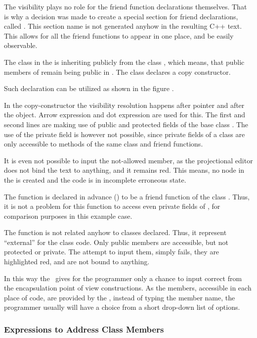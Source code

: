 The visibility plays no role for the friend function 
declarations themselves. That is why a decision was made to create a special 
section for friend declarations, called . This section name is not generated anyhow in the 
resulting C++ text. This allows for all the friend functions to appear in one place, 
and be easily observable.

The class  in the  is inheriting publicly from the class , which means,
that public members of  remain being public in . The class  declares
a copy constructor.

Such declaration can be utilized as shown in the figure .


In the copy-constructor the visibility resolution happens after  pointer
and after the  object. Arrow expression and dot expression are used for
this. The first and second lines are making use of public and protected fields of 
the base class . The use of the private field is however not possible, since
private fields of a class are only accessible to methods of the same class and
friend functions. 

It is even not possible to input the not-allowed member, as the projectional editor
does not bind the text to anything, and it remains red. This means, no node in the 
is created and the code is in incomplete erroneous state.


The  function is declared in advance () to be a friend 
function of the class . Thus, it is not a problem for this function to access
even private fields of , for comparison purposes in this example case.

The function  is not related anyhow to classes declared. Thus,
it represent ``external'' for the class  code. Only public members
are accessible, but not protected or private. The attempt to input them, simply
fails, they are highlighted red, and are not bound to anything.

In this way the \pcpp\ gives for the programmer only a chance to input correct from the encapsulation
point of view constructions. As the members, accessible in each place of code, are provided by the 
\pcpp, instead of typing the member name, the programmer usually will have a choice from a short drop-down
list of options.

\subsubsection{Expressions to Address Class Members}


